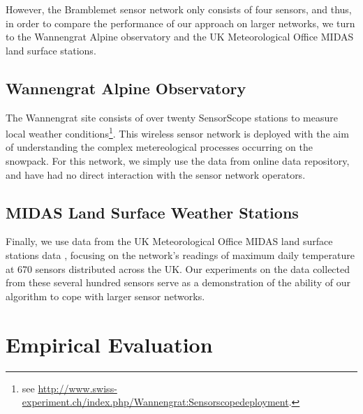 \documentclass{acmtrans2m}
\begin{document}
However, the Bramblemet sensor network only consists of four sensors, and thus, in order to compare the performance of our approach on larger networks, we turn to the Wannengrat Alpine observatory and the UK Meteorological Office MIDAS land surface stations.

\subsection{Wannengrat Alpine Observatory}

The Wannengrat site consists of over twenty SensorScope stations to measure local weather conditions\footnote{see \url{http://www.swiss-experiment.ch/index.php/Wannengrat:Sensorscopedeployment}.}. This wireless sensor network is deployed with the aim of understanding the complex metereological processes occurring on the snowpack. For this network, we simply use the data from online data repository, and have had no direct interaction with the sensor network operators.

\subsection{MIDAS Land Surface Weather Stations}

Finally, we use data from the UK Meteorological Office MIDAS land surface stations data \cite{MIDASdata}, focusing on the network's readings of maximum daily temperature at 670 sensors distributed across the UK. Our experiments on the data collected from these several hundred sensors serve as a demonstration of the ability of our algorithm to cope with larger sensor networks. 

\section{Empirical Evaluation}\label{sec_evaluation}
\end{document}

